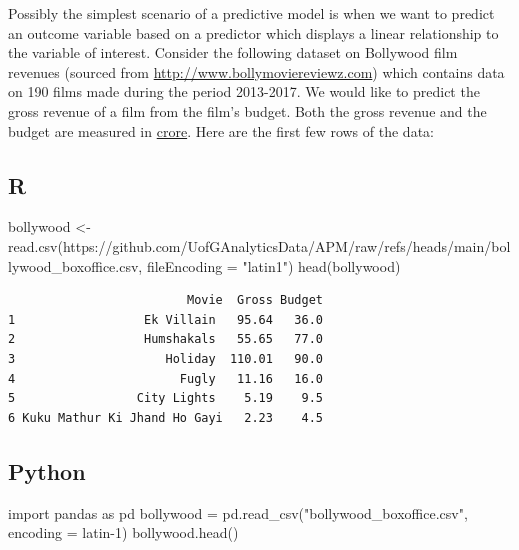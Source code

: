 \documentclass[
  a4paper,
  DIV=11,
  numbers=noendperiod]{scrreprt}
\newenvironment{Shaded}{\begin{snugshade}}{\end{snugshade}}
\newcommand{\AttributeTok}[1]{\textcolor[rgb]{0.40,0.45,0.13}{#1}}
\newcommand{\FunctionTok}[1]{\textcolor[rgb]{0.28,0.35,0.67}{#1}}
\newcommand{\ImportTok}[1]{\textcolor[rgb]{0.00,0.46,0.62}{#1}}
\newcommand{\NormalTok}[1]{\textcolor[rgb]{0.00,0.23,0.31}{#1}}
\newcommand{\OperatorTok}[1]{\textcolor[rgb]{0.37,0.37,0.37}{#1}}
\newcommand{\OtherTok}[1]{\textcolor[rgb]{0.00,0.23,0.31}{#1}}
\newcommand{\StringTok}[1]{\textcolor[rgb]{0.13,0.47,0.30}{#1}}
\newenvironment{fbxSimple}[3]{\begin{tcolorbox}[enhanced, breakable,%
attach boxed title to top*={xshift=1.4pt},
boxed title style={boxrule=0.0mm, fuzzy shadow={1pt}{-1pt}{0mm}{0.1mm}{gray}, arc=.3em, rounded corners=east, sharp corners=west}, colframe=#1-color2, colbacktitle=#1-color1, colback = white, coltitle=black,  titlerule=0mm, toprule=0pt, bottomrule=.7pt, leftrule=.3em, rightrule=.7pt, outer arc=.3em,  	left=.5em, right=.5em, bottomtitle=1mm, toptitle=1mm,title=\textbf{#2}\hspace{0.5em}{#3}]}
{\end{tcolorbox}}
\begin{document}
\label{bollywood-box-office-revenue}
\begin{fbxSimple}{Example}{Example 1: }{Bollywood box office revenue}
\label{bollywood-box-office-revenue}

Possibly the simplest scenario of a predictive model is when we want to
predict an outcome variable based on a predictor which displays a linear
relationship to the variable of interest. Consider the following dataset
on Bollywood film revenues (sourced from
\url{http://www.bollymoviereviewz.com}) which contains data on 190 films
made during the period 2013-2017. We would like to predict the gross
revenue of a film from the film's budget. Both the gross revenue and the
budget are measured in
\href{https://en.wikipedia.org/wiki/Crore}{crore}. Here are the first
few rows of the data:

\pagebreak

\subsection{R}

\begin{Shaded}
\begin{Highlighting}[]
\NormalTok{bollywood }\OtherTok{\textless{}{-}} \FunctionTok{read.csv}\NormalTok{(}\StringTok{\textquotesingle{}https://github.com/UofGAnalyticsData/APM/raw/refs/heads/main/bollywood\_boxoffice.csv\textquotesingle{}}\NormalTok{, }\AttributeTok{fileEncoding =} \StringTok{"latin1"}\NormalTok{)}
\FunctionTok{head}\NormalTok{(bollywood)}
\end{Highlighting}
\end{Shaded}

\begin{verbatim}
                         Movie  Gross Budget
1                  Ek Villain   95.64   36.0
2                  Humshakals   55.65   77.0
3                     Holiday  110.01   90.0
4                       Fugly   11.16   16.0
5                 City Lights    5.19    9.5
6 Kuku Mathur Ki Jhand Ho Gayi   2.23    4.5
\end{verbatim}

\subsection{Python}

\begin{Shaded}
\begin{Highlighting}[]
\ImportTok{import}\NormalTok{ pandas }\ImportTok{as}\NormalTok{ pd}
\NormalTok{bollywood }\OperatorTok{=}\NormalTok{ pd.read\_csv(}\StringTok{"bollywood\_boxoffice.csv"}\NormalTok{, encoding }\OperatorTok{=} \StringTok{\textquotesingle{}latin{-}1\textquotesingle{}}\NormalTok{)}
\NormalTok{bollywood.head()}
\end{Highlighting}
\end{Shaded}


\end{fbxSimple}
\end{document}
